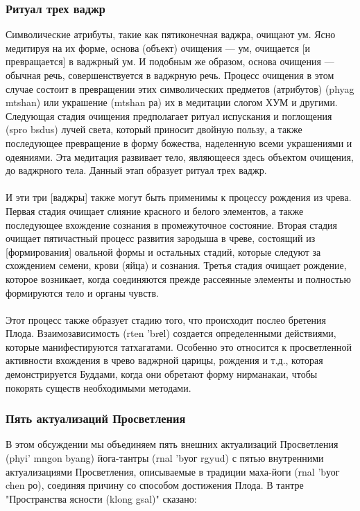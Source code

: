 \subsubsection{Ритуал трех ваджр}

Символические атрибуты, такие как пятиконечная ваджра, очищают ум. Ясно медитируя
на их форме, основа (объект) очищения — ум, очищается [и превращается] в ваджрный ум.
И подобным же образом, основа очищения — обычная речь, совершенствуется в ваджрную речь.
Процесс очищения в этом случае состоит в превращении этих символических предметов
(атрибутов) (phyag mtshan) или украшение (mtshan ра) их в медитации слогом ХУМ и
другими. Следующая стадия очищения предполагает ритуал испускания и поглощения (spro
bsdus) лучей света, который приносит двойную пользу, а также последующее превращение в
форму божества, наделенную всеми украшениями и одеяниями. Эта медитация развивает
тело, являющееся здесь объектом очищения, до ваджрного тела. Данный этап образует
ритуал трех ваджр.\\
\\
И эти три [ваджры] также могут быть применимы к процессу рождения из чрева. Первая
стадия очищает слияние красного и белого элементов, а также последующее вхождение
сознания в промежуточное состояние. Вторая стадия очищает пятичастный процесс развития
зародыша в чреве, состоящий из [формирования] овальной формы и остальных стадий,
которые следуют за схождением семени, крови (яйца) и сознания. Третья стадия очищает
рождение, которое возникает, когда соединяются прежде рассеянные элементы и полностью
формируются тело и органы чувств.\\
\\
Этот процесс также образует стадию того, что происходит послео бретения Плода.
Взаимозависимость (rten 'brеl) создается определенными действиями, которые
манифестируются татхагатами. Особенно это относится к просветленной активности
вхождения в чрево ваджрной царицы, рождения и т.д., которая демонстрируется Буддами,
когда они обретают форму нирманакаи, чтобы покорять существ необходимыми методами.

\subsubsection{Пять актуализаций Просветления}

В этом обсуждении мы объединяем пять внешних актуализаций Просветления (phyi' mngon byang)
йога-тантры (rnal 'bуог rgyud) с пятью внутренними актуализациями
Просветления, описываемые в традиции маха-йоги (rnal 'bуог chen ро), соединяя причину со
способом достижения Плода. В тантре "Пространства ясности (klong gsal)" сказано:

